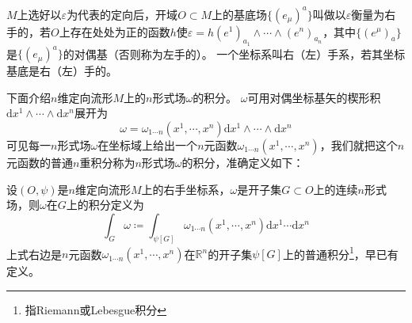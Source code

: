 \begin{definition}
    $M$上选好以$\varepsilon$为代表的定向后，开域$O \subset M$上的基底场$\{(e_\mu)^a\}$叫做以$\varepsilon$衡量为右手的，若$O$上存在处处为正的函数$h$使$\varepsilon = h(e^1)_{a_1} \wedge \cdots \wedge (e^n)_{a_n}$，其中$\{(e^\mu)_a\}$是$\{(e_\mu)^a\}$的对偶基（否则称为左手的）。
    一个坐标系叫右（左）手系，若其坐标基底是右（左）手的。
\end{definition}

下面介绍$n$维定向流形$M$上的$n$形式场$\omega$的积分。
$\omega$可用对偶坐标基矢的楔形积$\mathrm{d}x^1 \wedge \cdots \wedge \mathrm{d}x^n$展开为
$$\omega = \omega_{1 \cdots n}(x^1, \cdots, x^n)\mathrm{d}x^1 \wedge \cdots \wedge \mathrm{d}x^n$$
可见每一$n$形式场$\omega$在坐标域上给出一个$n$元函数$\omega_{1 \cdots n}(x^1, \cdots, x^n)$，我们就把这个$n$元函数的普通$n$重积分称为$n$形式场$\omega$的积分，准确定义如下：

\begin{definition}
    设$(O, \psi)$是$n$维定向流形$M$上的右手坐标系，$\omega$是开子集$G \subset O$上的连续$n$形式场，则$\omega$在$G$上的积分定义为
    $$\int_G\omega \coloneq \int_{\psi[G]}\omega_{1 \cdots n}(x^1, \cdots, x^n)\mathrm{d}x^1 \cdots \mathrm{d}x^n$$
    上式右边是$n$元函数$\omega_{1 \cdots n}(x^1, \cdots, x^n)$在$\mathbb{R}^n$的开子集$\psi[G]$上的普通积分\footnote{指Riemann或Lebesgue积分}，早已有定义。
\end{definition}

